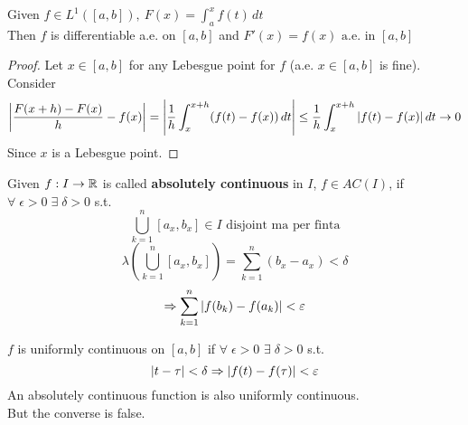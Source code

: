 \begin{theorem}
Given \(f \in L^1([a,b]),\ F(x) = \int_a^xf(t) \, dt\) \\
Then \(f\) is differentiable a.e. on \([a,b]\) and \(F'(x) = f(x) \text{ a.e. in } [a,b]\)    
\end{theorem}
\begin{proof}
    Let \(x \in [a,b]\) for any Lebesgue point for \(f\) (a.e. \(x \in [a,b]\) is fine). Consider
    \[
        \left|{\frac{F(x+h)-F(x)}{h} - f(x)}\right| = \abs{\frac{1}{h} \int_x^{x+h} (f(t) - f(x)) \,dt } \leq \frac{1}{h} \int_x^{x+h} |f(t) - f(x)| \,dt \to 0 
    \]
    Since \(x\) is a Lebesgue point.
\end{proof}
\begin{definition}
    Given \(f : I \to \mathbb{R}\) is called \textbf{absolutely continuous} in \(I\), \(f \in AC(I)\), if \(\forall \; \epsilon >0 \; \exists \; \delta >0\)  
    s.t. 
    \[
        \bigcup_{k=1}^n [a_x, b_x] \in I \text{ disjoint ma per finta}
    \] 
    \[
        \lambda(\bigcup_{k=1}^n [a_x, b_x]) = \sum_{k=1}^n (b_x -a_x) < \delta
    \]
    \[
        \Rightarrow \sum_{k=1}^n \abs{f(b_k)-f(a_k)} < \varepsilon
    \]
\end{definition}
\begin{remark}
    \(f\) is uniformly continuous on \([a,b]\) if \(\forall \; \epsilon > 0\) \(\exists \; \delta > 0\) s.t. 
    \[
        \abs{t - \tau} < \delta \Rightarrow \abs{f(t)-f(\tau)} < \varepsilon
    \]
    An absolutely continuous function is also uniformly continuous. \\
    But the converse is false.
\end{remark}

